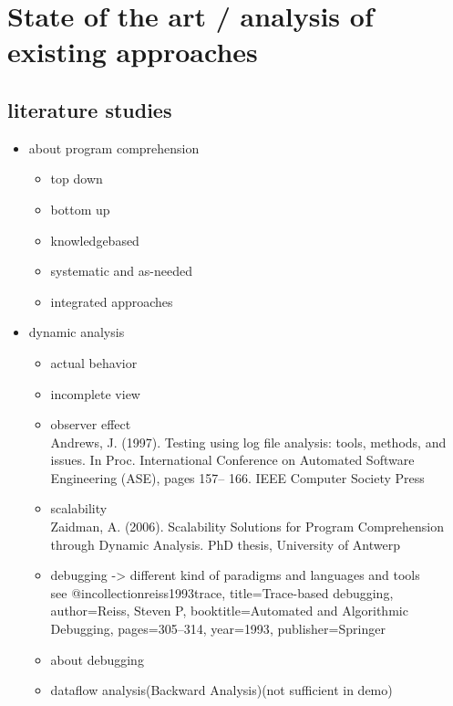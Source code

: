 \chapter{State of the art / analysis of existing approaches}

\section{literature studies}

\begin{itemize}
	\item about program comprehension
		\begin{itemize}
		\item top down
		\item bottom up
		\item knowledgebased
		\item systematic and as-needed
		\item integrated approaches
		\end{itemize}
	\item dynamic analysis
		\begin{itemize}
		\item actual behavior
		\item incomplete view \cite{Ball:1999:CDA:318774.318944}
		\item observer effect \\
		Andrews, J. (1997). Testing using log file analysis: tools, methods, and issues.
		In Proc. International Conference on Automated Software Engineering (ASE), pages 157–
		166. IEEE Computer Society Press
		\item scalability \\
		Zaidman, A. (2006). Scalability Solutions for Program Comprehension through Dynamic
		Analysis. PhD thesis, University of Antwerp
		\item debugging -> different kind of paradigms and languages and tools\\
		 see @incollection{reiss1993trace,
		  title={Trace-based debugging},
		  author={Reiss, Steven P},
		  booktitle={Automated and Algorithmic Debugging},
		  pages={305--314},
		  year={1993},
		  publisher={Springer}
		}
		\end{itemize}
	\begin{itemize} \item about debugging \end{itemize}
	\begin{itemize}
	\item dataflow analysis(Backward Analysis)(not sufficient in demo) \\

\end{itemize}
\end{itemize}
